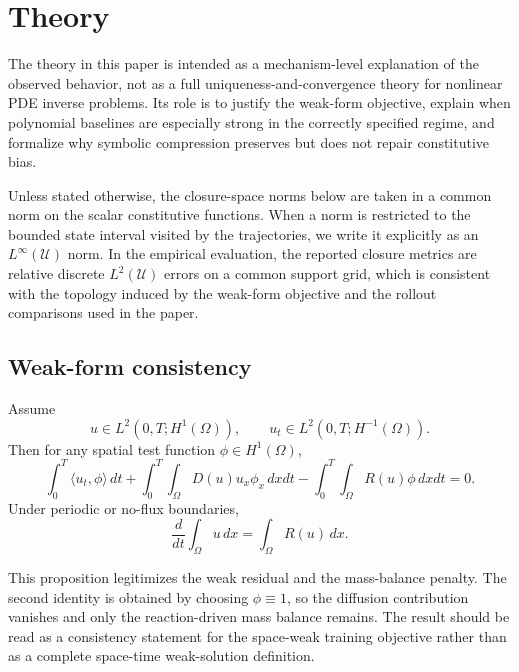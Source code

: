 \section{Theory}

The theory in this paper is intended as a mechanism-level explanation of the observed behavior, not as a full uniqueness-and-convergence theory for nonlinear PDE inverse problems. Its role is to justify the weak-form objective, explain when polynomial baselines are especially strong in the correctly specified regime, and formalize why symbolic compression preserves but does not repair constitutive bias.

Unless stated otherwise, the closure-space norms below are taken in a common norm on the scalar constitutive functions. When a norm is restricted to the bounded state interval visited by the trajectories, we write it explicitly as an $L^\infty(\mathcal{U})$ norm. In the empirical evaluation, the reported closure metrics are relative discrete $L^2(\mathcal{U})$ errors on a common support grid, which is consistent with the topology induced by the weak-form objective and the rollout comparisons used in the paper.

\subsection{Weak-form consistency}

\begin{proposition}
Assume
\begin{equation}
u \in L^2(0,T;H^1(\Omega)),
\qquad
u_t \in L^2(0,T;H^{-1}(\Omega)).
\end{equation}
Then for any spatial test function $\phi \in H^1(\Omega)$,
\begin{equation}
\int_0^T \langle u_t,\phi \rangle \, dt
+ \int_0^T \int_\Omega D(u) u_x \phi_x \, dx dt
- \int_0^T \int_\Omega R(u) \phi \, dx dt
= 0.
\end{equation}
Under periodic or no-flux boundaries,
\begin{equation}
\frac{d}{dt} \int_\Omega u \, dx = \int_\Omega R(u) \, dx.
\end{equation}
\end{proposition}

This proposition legitimizes the weak residual and the mass-balance penalty. The second identity is obtained by choosing $\phi \equiv 1$, so the diffusion contribution vanishes and only the reaction-driven mass balance remains. The result should be read as a consistency statement for the space-weak training objective rather than as a complete space-time weak-solution definition.

